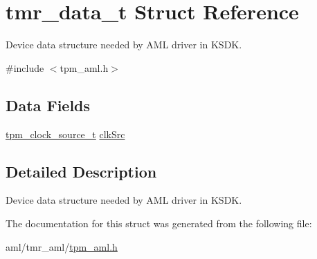 \hypertarget{structtmr__data__t}{}\section{tmr\+\_\+data\+\_\+t Struct Reference}
\label{structtmr__data__t}


Device data structure needed by A\+ML driver in K\+S\+DK.  




{\ttfamily \#include $<$tpm\+\_\+aml.\+h$>$}

\subsection*{Data Fields}
\begin{DoxyCompactItemize}
\item 
\mbox{\hyperlink{group__tpm_gac9f0f29f5ff0e39eea892919dc9b50d8}{tpm\+\_\+clock\+\_\+source\+\_\+t}} \mbox{\hyperlink{group__struct__group_gae714239d1fabd3df000d89beb931051a}{clk\+Src}}
\end{DoxyCompactItemize}


\subsection{Detailed Description}
Device data structure needed by A\+ML driver in K\+S\+DK. 

The documentation for this struct was generated from the following file\+:\begin{DoxyCompactItemize}
\item 
aml/tmr\+\_\+aml/\mbox{\hyperlink{tpm__aml_8h}{tpm\+\_\+aml.\+h}}\end{DoxyCompactItemize}

